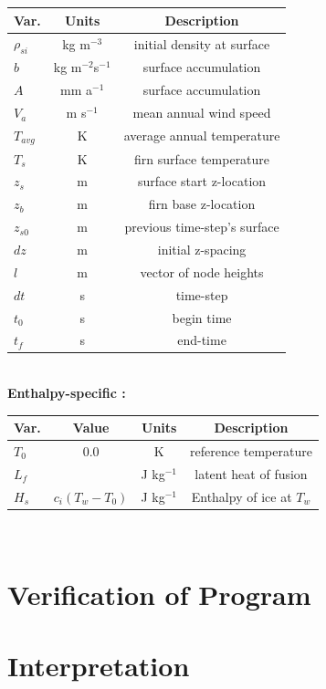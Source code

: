 \documentclass{article}%
\begin{document}
\footnotesize
\noindent\begin{tabular}{lcc}
\hline
Var. & Units & Description\\
\hline
$\rho_{si}$ & kg m$^{-3}$ & initial density at surface\\
$b$  & kg m$^{-2}$s$^{-1}$ & surface accumulation\\
$A$  & mm a$^{-1}$ & surface accumulation\\
$V_a$  & m s$^{-1}$ & mean annual wind speed\\
$T_{avg}$ & K & average annual temperature\\
$T_{s}$ & K & firn surface temperature\\
$z_s$ & m & surface start z-location\\
$z_b$ & m & firn base z-location\\
$z_{s0}$ & m & previous time-step's surface\\
$dz$ & m & initial z-spacing\\
$l$ & m & vector of node heights\\
$dt$ & s & time-step\\
$t_0$ & s & begin time\\
$t_f$ & s & end-time\\
\hline
\end{tabular}
\normalsize\\

\noindent\textbf{Enthalpy-specific :}

\footnotesize
\noindent\begin{tabular}{lccc}
\hline
Var. & Value & Units & Description\\
\hline
$T_0$ & $0.0$ & K & reference temperature\\
$L_f$ & \SI{3.34e5} & J kg$^{-1}$ & latent heat of fusion\\
$H_s$ & $c_i(T_w - T_0)$ & J kg$^{-1}$ &  Enthalpy of ice at $T_w$\\
\hline
\end{tabular}
\normalsize\\


\section{Verification of Program}


\section{Interpretation}
\end{document}
